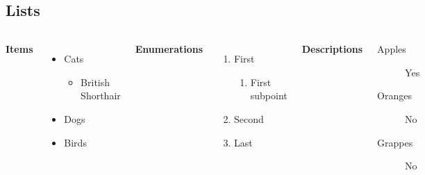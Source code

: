 \documentclass[
11pt,notheorems,hyperref={pdfauthor=Maghfira Ramadhani}
]{beamer}
\begin{document}
\subsection{Lists}

\begin{frame}
    \begin{columns}[T,onlytextwidth]
      \textbf{Items}
      \begin{itemize}
        \item Cats 
        \begin{itemize}
            \item British Shorthair
        \end{itemize}
        \item Dogs \item Birds
      \end{itemize}

      \textbf{Enumerations}
      \begin{enumerate}
        \item First 
        \begin{enumerate}
            \item First subpoint
        \end{enumerate}
        \item Second \item Last
      \end{enumerate}

      \textbf{Descriptions}
      \begin{description}
        \item[Apples] Yes \item[Oranges] No \item[Grappes] No
      \end{description}
\end{columns}
\end{frame}
\end{document}
